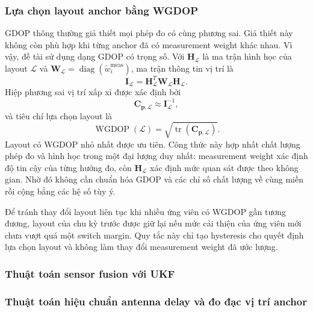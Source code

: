 \documentclass[
  a4paper,
]{report}
\begin{document}
\subsubsection{Lựa chọn layout anchor bằng WGDOP}

GDOP thông thường giả thiết mọi phép đo có cùng phương sai. Giả thiết này
không còn phù hợp khi từng anchor đã có measurement weight khác nhau. Vì vậy,
đề tài sử dụng dạng GDOP có trọng số. Với $\mathbf H_{\mathcal L}$ là ma trận
hình học của layout $\mathcal L$ và
$\mathbf{W}_{\mathcal L}=\operatorname{diag}
(\widetilde w_i^{\mathrm{meas}})$, ma trận thông tin vị trí là
\begin{equation}
  \mathbf I_{\mathcal L}=
  \mathbf H_{\mathcal L}^{T}
  \mathbf W_{\mathcal L}
  \mathbf H_{\mathcal L}.
  \label{eq:weighted-layout-information}
\end{equation}
Hiệp phương sai vị trí xấp xỉ được xác định bởi
\begin{equation}
  \mathbf C_{\mathbf p,\mathcal L}
  \approx \mathbf I_{\mathcal L}^{-1},
  \label{eq:layout-position-covariance}
\end{equation}
và tiêu chí lựa chọn layout là
\begin{equation}
  \operatorname{WGDOP}(\mathcal L)=
  \sqrt{\operatorname{tr}
  \left(\mathbf C_{\mathbf p,\mathcal L}\right)}.
  \label{eq:weighted-gdop}
\end{equation}
Layout có WGDOP nhỏ nhất được ưu tiên. Công thức này hợp nhất chất lượng phép
đo và hình học trong một đại lượng duy nhất: measurement weight xác định độ
tin cậy của từng hướng đo, còn $\mathbf H_{\mathcal L}$ xác định mức quan sát
được theo không gian. Nhờ đó không cần chuẩn hóa GDOP và các chỉ số chất lượng
về cùng miền rồi cộng bằng các hệ số tùy ý.

Để tránh thay đổi layout liên tục khi nhiều ứng viên có WGDOP gần tương
đương, layout của chu kỳ trước được giữ lại nếu mức cải thiện của ứng viên mới
chưa vượt quá một switch margin. Quy tắc này chỉ tạo hysteresis cho quyết định
lựa chọn layout và không làm thay đổi measurement weight đã ước lượng.

\subsubsection{Thuật toán sensor fusion với UKF}

\vspace{4cm}

\subsubsection{Thuật toán hiệu chuẩn antenna delay và đo đạc vị trí anchor}
\end{document}

